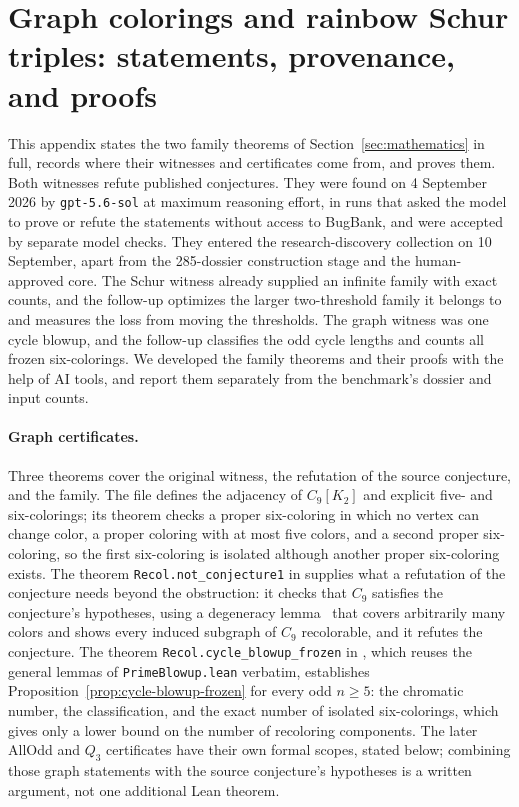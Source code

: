 \section{Graph colorings and rainbow Schur triples: statements, provenance, and proofs}
\label{app:structural-case-studies}
\label{sec:counterexample-structure}
This appendix states the two family theorems of Section~\ref{sec:mathematics} in full, records where their witnesses and certificates come from, and proves them. Both witnesses refute published conjectures. They were found on 4 September 2026 by \texttt{gpt-5.6-sol} at maximum reasoning effort, in runs that asked the model to prove or refute the statements without access to BugBank, and were accepted by separate model checks. They entered the research-discovery collection on 10 September, apart from the 285-dossier construction stage and the human-approved core. The Schur witness already supplied an infinite family with exact counts, and the follow-up optimizes the larger two-threshold family it belongs to and measures the loss from moving the thresholds. The graph witness was one cycle blowup, and the follow-up classifies the odd cycle lengths and counts all frozen six-colorings. We developed the family theorems and their proofs with the help of AI tools, and report them separately from the benchmark's dossier and input counts.

\paragraph{Graph certificates.}
Three theorems cover the original witness, the refutation of the source conjecture, and the family. The file  defines the adjacency of $C_9[K_2]$ and explicit five- and six-colorings; its theorem  checks a proper six-coloring in which no vertex can change color, a proper coloring with at most five colors, and a second proper six-coloring, so the first six-coloring is isolated although another proper six-coloring exists. The theorem \texttt{Recol.not\_conjecture1} in  supplies what a refutation of the conjecture needs beyond the obstruction: it checks that $C_9$ satisfies the conjecture's hypotheses, using a degeneracy lemma~\citep{cereceda2008connectedness} that covers arbitrarily many colors and shows every induced subgraph of $C_9$ recolorable, and it refutes the conjecture. The theorem \texttt{Recol.cycle\_blowup\_frozen} in , which reuses the general lemmas of \texttt{PrimeBlowup.lean} verbatim, establishes Proposition~\ref{prop:cycle-blowup-frozen} for every odd $n\ge5$: the chromatic number, the classification, and the exact number of isolated six-colorings, which gives only a lower bound on the number of recoloring components. The later AllOdd and $Q_3$ certificates have their own formal scopes, stated below; combining those graph statements with the source conjecture's hypotheses is a written argument, not one additional Lean theorem.

